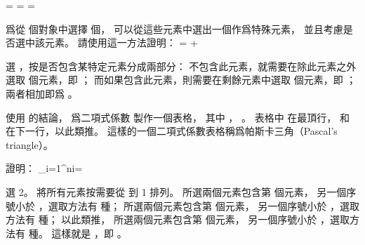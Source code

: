 \startANSWER
\startformula
{} = 
    = 
    = 
\stopformula
\stopANSWER

\startEXERCISE[exercise:C.1-7]
爲從  個對象中選擇  個，
可以從這些元素中選出一個作爲特殊元素，
並且考慮是否選中該元素。
請使用這一方法證明：
\startformula
{} =  + 
\stopformula
\stopEXERCISE

\startANSWER
{} 選 ，按是否包含某特定元素分成兩部分：
不包含此元素，就需要在除此元素之外選取  個元素，即 ；
而如果包含此元素，則需要在剩餘元素中選取  個元素，即 ；
兩者相加即爲 。
\stopANSWER

\startEXERCISE
使用 的結論，
爲二項式係數  製作一個表格，
其中 ， 。
表格中  在最頂行，
  和  在下一行，以此類推。
這樣的一個二項式係數表格稱爲{\EMP 帕斯卡三角}（Pascal's triangle）。
\stopEXERCISE

\startANSWER
\startformula\startmathalignment[n=13,align={
 middle,middle,middle,middle,middle,middle,middle,middle,middle,middle,middle,middle,middle}]
\NC   \NC   \NC   \NC   \NC    \NC    {}  \NC    \NC    \NC   \NC   \NC   \NC   \NR
\NC   \NC   \NC   \NC   \NC    {}  \NC    {}  \NC    \NC   \NC   \NC   \NC   \NR
\NC   \NC   \NC   \NC   {}  \NC    {}  \NC    {}  \NC   \NC   \NC   \NC   \NR
\NC   \NC   \NC   {} \NC    {}  \NC    {}  \NC    {} \NC   \NC   \NC   \NR
\NC   \NC   {} \NC   {}  \NC    {}  \NC    {}  \NC   {} \NC   \NC   \NR
\NC   {} \NC   {} \NC    {} \NC    {} \NC    {} \NC   {} \NC   \NR
{} \NC   {} \NC   {} \NC    {} \NC    {} \NC   {} \NC   {} \NR
\stopmathalignment\stopformula
\stopANSWER

\startEXERCISE
證明：
\startformula
\sum_{i=1}^{n}i=
\stopformula
\stopEXERCISE

\startANSWER
{} 選 2。
將所有元素按需要從  到 1 排列。
所選兩個元素包含第  個元素，
另一個序號小於 ，選取方法有  種；
所選兩個元素包含第  個元素，
另一個序號小於 ，選取方法有  種；
以此類推，
所選兩個元素包含第  個元素，
另一個序號小於 ，選取方法有  種。
這樣就是 ，即 。
\stopANSWER

